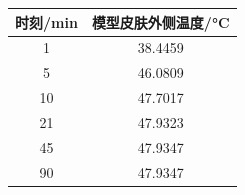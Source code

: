 \begin{tabular}{cc}
  \toprule
    时刻/\si{min} & 模型皮肤外侧温度/\si{\celsius} \\
  \midrule
    1 & 38.4459 \\
    5 & 46.0809 \\
    10 & 47.7017 \\
    21 & 47.9323 \\
    45 & 47.9347 \\
    90 & 47.9347 \\
  \bottomrule
\end{tabular}
